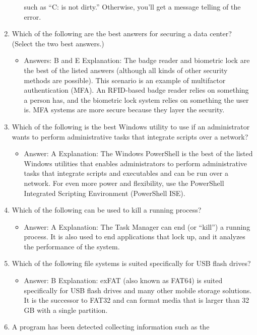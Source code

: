 \documentclass{article}
\begin{document}
\begin{enumerate}
\begin{itemize}
such as “C: is not dirty.” Otherwise, you’ll get a message telling of the error.
    \end{itemize}
    \item Which of the following are the best answers for securing a data
center? (Select the two best answers.)
    \begin{itemize}
        \item Answers: B and E
Explanation: The badge reader and biometric lock are the best of the listed answers
(although all kinds of other security methods are possible). This scenario is an example
of multifactor authentication (MFA). An RFID-based badge reader relies on something
a person has, and the biometric lock system relies on something the user is. MFA
systems are more secure because they layer the security.
    \end{itemize}
    \item Which of the following is the best Windows utility to use if an
administrator wants to perform administrative tasks that integrate
scripts over a network?
    \begin{itemize}
        \item Answer: A
Explanation: The Windows PowerShell is the best of the listed Windows utilities that
enables administrators to perform administrative tasks that integrate scripts and executables
and can be run over a network. For even more power and flexibility, use the
PowerShell Integrated Scripting Environment (PowerShell ISE).
    \end{itemize}
    \item Which of the following can be used to kill a running process?
    \begin{itemize}
        \item Answer: A
Explanation: The Task Manager can end (or “kill”) a running process. It is also used to
end applications that lock up, and it analyzes the performance of the system.
    \end{itemize}
    \item Which of the following file systems is suited specifically for USB
flash drives?
    \begin{itemize}
        \item Answer: B
Explanation: exFAT (also known as FAT64) is suited specifically for USB flash drives
and many other mobile storage solutions. It is the successor to FAT32 and can format
media that is larger than 32 GB with a single partition.
    \end{itemize}
    \item A program has been detected collecting information such as the

\end{enumerate}
\end{document}

